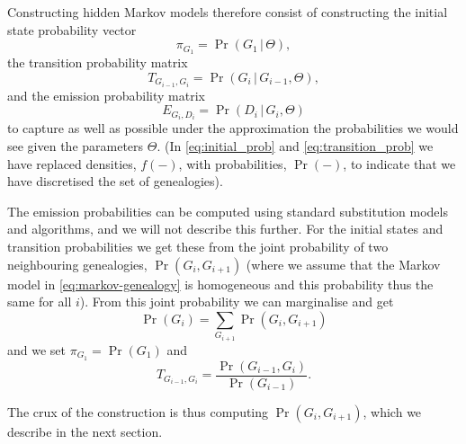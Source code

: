\documentclass[graybox]{svmult}
\newcommand{\G}{\ensuremath{G}}
\renewcommand{\D}{\ensuremath{D}}
\newcommand{\T}{\ensuremath{T}}
\renewcommand{\E}{\ensuremath{E}}
\begin{document}
Constructing hidden Markov models therefore consist of constructing the initial state probability vector
\begin{equation}
  \label{eq:initial_prob}
  \pi_{\G_1} = \Pr(\G_1\,|\,\Theta),
\end{equation}
the transition probability matrix
\begin{equation}
  \label{eq:transition_prob}
  \T_{\G_{i-1},\G_i} = \Pr(\G_i\,|\,\G_{i-1},\Theta),
\end{equation}
and the emission probability matrix
\begin{equation}
  \E_{\G_i,\D_i} = \Pr(\D_i\,|\,\G_i,\Theta)
\end{equation}
to capture as well as possible under the approximation the probabilities we would see given the parameters $\Theta$. (In \eqref{eq:initial_prob} and \eqref{eq:transition_prob} we have replaced densities, $f(-)$, with probabilities, $\Pr(-)$, to indicate that we have discretised the set of genealogies).

The emission probabilities can be computed using standard substitution models and algorithms, and we will not describe this further. For the initial states and transition probabilities we get these from the joint probability of two neighbouring genealogies, $\Pr(\G_i,\G_{i+1})$ (where we assume that the Markov model in \eqref{eq:markov-genealogy} is homogeneous and this probability thus the same for all $i$). From this joint probability we can marginalise and get
\begin{equation} \label{eq:pi-from-joint-prob}
  \Pr(\G_i) = \sum_{\G_{i+1}} \Pr(\G_i,\G_{i+1})
\end{equation}
and we set $\pi_{\G_1}=\Pr(\G_1)$ and 
\begin{equation} \label{eq:transitions-from-joint-prob}
  \T_{\G_{i-1},\G_i} = \frac{\Pr(\G_{i-1},\G_i)}{\Pr(\G_{i-1})}.
\end{equation}

The crux of the construction is thus computing $\Pr(\G_i,\G_{i+1})$, which we describe in the next section.
\end{document}
